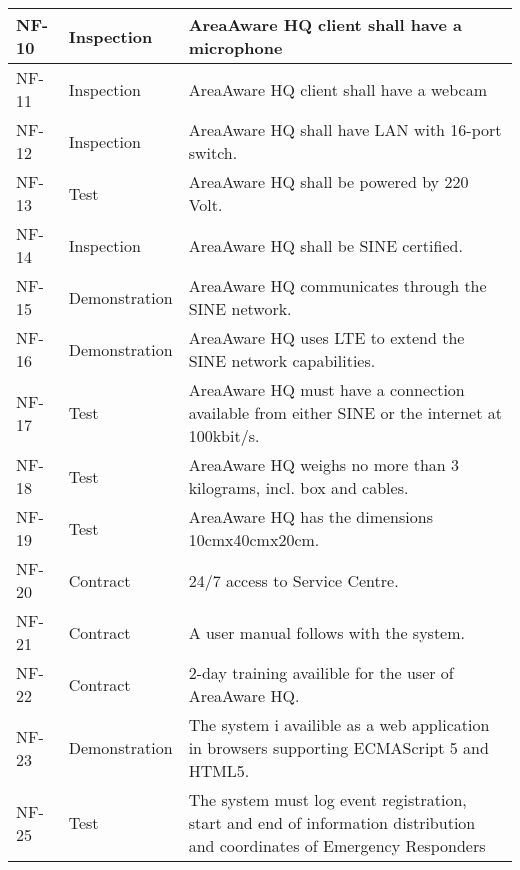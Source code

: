 \begin{longtable}{| p{2.4cm}  | p{2.6cm} | p{6.6cm} |  }
	NF-10	& Inspection	& AreaAware HQ client shall have a microphone \\ \hline
	NF-11	& Inspection	& AreaAware HQ client shall have a webcam \\ \hline
	NF-12	& Inspection	& AreaAware HQ shall have LAN with 16-port switch. \\ \hline
	NF-13	& Test			& AreaAware HQ shall be powered by 220 Volt. \\ \hline
	NF-14	& Inspection	& AreaAware HQ shall be SINE certified. \\ \hline
	NF-15	& Demonstration	& AreaAware HQ communicates through the SINE network. \\ \hline
	NF-16	& Demonstration	& AreaAware HQ uses LTE to extend the SINE network capabilities. \\ \hline
	NF-17	& Test			& AreaAware HQ must have a connection available from either SINE or the internet at 100kbit/s. \\ \hline
	NF-18	& Test			& AreaAware HQ weighs no more than 3 kilograms, incl. box and cables. \\ \hline
	NF-19	& Test			& AreaAware HQ has the dimensions 10cmx40cmx20cm. \\ \hline
	NF-20	& Contract		& 24/7 access to Service Centre. \\ \hline
	NF-21	& Contract		& A user manual follows with the system. \\ \hline
	NF-22	& Contract		& 2-day training availible for the user of AreaAware HQ. \\ \hline
	NF-23	& Demonstration	& The system i availible as a web application in browsers supporting ECMAScript 5 and HTML5. \\ \hline
	NF-25   & Test          & The system must log event registration, start and end of information distribution and coordinates of Emergency Responders \\ \hline
	
\end{longtable}
